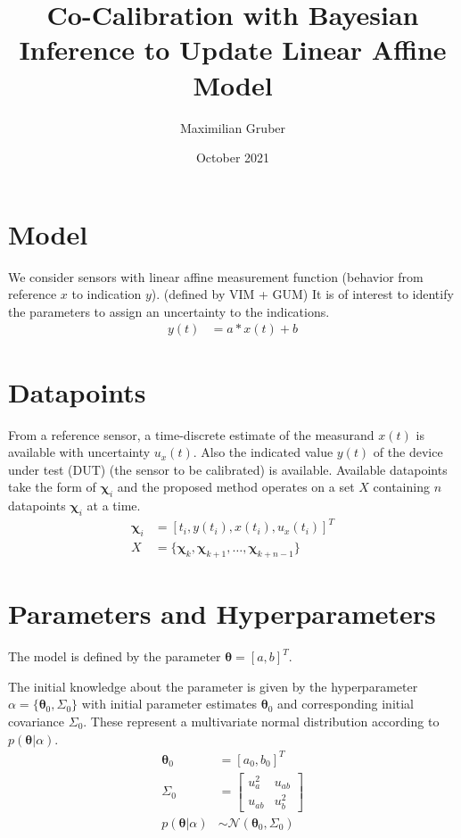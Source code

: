\documentclass[10pt]{article}
\title{Co-Calibration with Bayesian Inference to Update Linear Affine Model}
\author{Maximilian Gruber}    %
\date{October 2021}
\renewcommand{\vec}[1]{\boldsymbol{#1}}
\newcommand{\mat}[1]{#1}
\begin{document}
    \maketitle
    
    \section{Model}
    We consider sensors with linear affine measurement function (behavior from reference $x$ to indication $y$). (defined by VIM + GUM)
    It is of interest to identify the parameters to assign an uncertainty to the indications.
    \begin{align}
        y(t) &= a*x(t) + b
    \end{align}
    
    \section{Datapoints}
    From a reference sensor, a time-discrete estimate of the measurand $x(t)$ is available with uncertainty $u_x(t)$. 
    Also the indicated value $y(t)$ of the device under test (DUT) (the sensor to be calibrated) is available. 
    Available datapoints take the form of $\vec{\chi}_i$ and the proposed method operates on a set $X$ containing $n$ datapoints $\vec{\chi}_i$ at a time.
    \begin{align}
        \vec{\chi}_i &= [t_i, y(t_i), x(t_i), u_x(t_i)]^T \\
        X &= \{\vec{\chi}_k, \vec{\chi}_{k+1}, \dots,  \vec{\chi}_{k+n-1}\} 
    \end{align}
    
    \section{Parameters and Hyperparameters}
    The model is defined by the parameter $\vec{\theta} = [a, b]^T$. 

    The initial knowledge about the parameter is given by the hyperparameter $\alpha = \{\vec{\theta}_0, \mat{\Sigma}_0\}$ with initial parameter estimates $\vec{\theta}_0$ and corresponding initial covariance $\mat{\Sigma}_0$.
    These represent a multivariate normal distribution according to $p(\vec{\theta} | \alpha)$.
    \begin{align}
        \vec{\theta}_0 &= [a_0, b_0]^T \\
        \mat{\Sigma}_0 &= \begin{bmatrix}u_a^2 & u_{ab} \\ u_{ab} & u_b^2\end{bmatrix} \\
        p(\vec{\theta} | \alpha) &\sim \mathcal{N}(\vec{\theta}_0, \mat{\Sigma}_0)
    \end{align}
    
\end{document}
